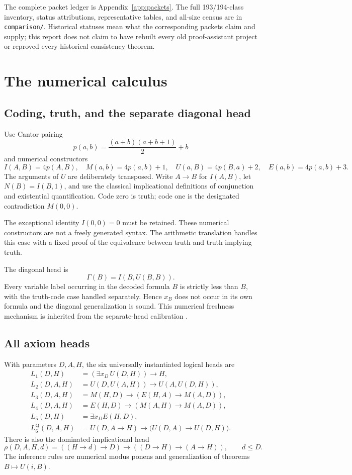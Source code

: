 \documentclass[11pt,letterpaper]{article}
\newcommand{\file}[1]{\texttt{\nolinkurl{#1}}}
\begin{document}
The complete packet ledger is Appendix~\ref{app:packets}. The full
193/194-class inventory, status attributions, representative tables,
and all-size census are in \file{comparison/}. Historical statuses
mean what the corresponding packets claim and supply; this report does
not claim to have rebuilt every old proof-assistant project or reproved
every historical consistency theorem.

\section{The numerical calculus}\label{sec:calculus}

\subsection{Coding, truth, and the separate diagonal head}

Use Cantor pairing
\[
 p(a,b)=\frac{(a+b)(a+b+1)}2+b
\]
and numerical constructors
\[
 I(A,B)=4p(A,B),\quad M(a,b)=4p(a,b)+1,\quad
 U(a,B)=4p(B,a)+2,\quad E(a,b)=4p(a,b)+3.
\]
The arguments of $U$ are deliberately transposed. Write $A\to B$ for
$I(A,B)$, let $N(B)=I(B,1)$, and use the classical implicational
definitions of conjunction and existential quantification. Code zero
is truth; code one is the designated contradiction $M(0,0)$.

The exceptional identity $I(0,0)=0$ must be retained. These numerical
constructors are not a freely generated syntax. The arithmetic
translation handles this case with a fixed proof of the equivalence
between truth and truth implying truth.

The diagonal head is
\[
 \Gamma(B)=I(B,U(B,B)).
\]
Every variable label occurring in the decoded formula $B$ is strictly
less than $B$, with the truth-code case handled separately. Hence $x_B$
does not occur in its own formula and the diagonal generalization is
sound. This numerical freshness mechanism is inherited from the
separate-head calibration \cite{primary,separate}.

\subsection{All axiom heads}

With parameters $D,A,H$, the six universally instantiated logical heads
are
\begin{align*}
 L_1(D,H)&=(\exists x_D\,U(D,H))\to H,\\
 L_2(D,A,H)&=U(D,U(A,H))\to U(A,U(D,H)),\\
 L_3(D,A,H)&=M(H,D)\to(E(H,A)\to M(A,D)),\\
 L_4(D,A,H)&=E(H,D)\to(M(A,H)\to M(A,D)),\\
 L_5(D,H)&=\exists x_D E(H,D),\\
 L_6^{\mathrm Q}(D,A,H)&=U(D,A\to H)\to
                     \bigl(U(D,A)\to U(D,H)\bigr).
\end{align*}
There is also the dominated implicational head
\[
 \rho(D,A,H,d)=((H\to d)\to D)\to
               ((D\to H)\to(A\to H)),\qquad d\le D.
\]
The inference rules are numerical modus ponens and generalization of
theorems $B\mapsto U(i,B)$.
\end{document}
